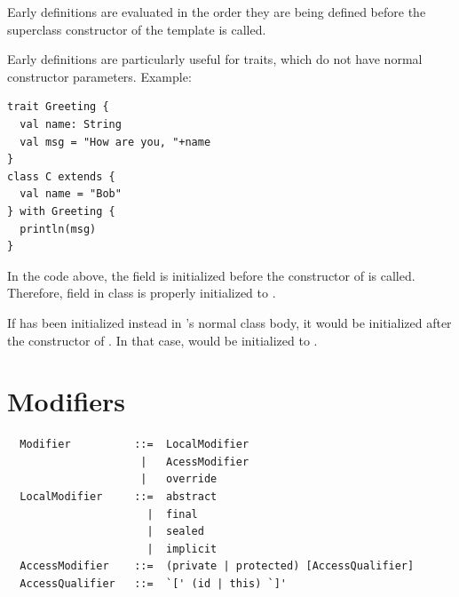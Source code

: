 Early definitions are evaluated in the order they are being defined
before the superclass constructor of the template is called.

\example Early definitions are particularly useful for
traits, which do not have normal constructor parameters. Example:
\begin{lstlisting}
trait Greeting {
  val name: String
  val msg = "How are you, "+name
}
class C extends {
  val name = "Bob"
} with Greeting {
  println(msg)
}
\end{lstlisting}
In the code above, the field  is initialized before the
constructor of  is called. Therefore, field \lstinline@msg@ in
class  is properly initialized to .

If  has been initialized instead in 's normal class
body, it would be initialized after the constructor of
. In that case, \lstinline@msg@ would be initialized to
.
  
 
\section{Modifiers}
\label{sec:modifiers}

\syntax\begin{lstlisting}
  Modifier          ::=  LocalModifier
                     |   AcessModifier
                     |   override
  LocalModifier     ::=  abstract
                      |  final
                      |  sealed
                      |  implicit
  AccessModifier    ::=  (private | protected) [AccessQualifier]
  AccessQualifier   ::=  `[' (id | this) `]'
\end{lstlisting}

